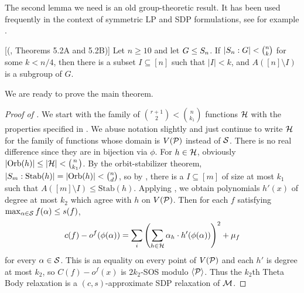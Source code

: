 The second lemma we need is an old group-theoretic result. It has been used frequently in the context of symmetric LP and SDP formulations, see for example \cite{LRST14,KPT10,BFPS12}. 
\begin{lemma}\label{lem:dixandmort}[(\cite{DM96}, Theorems 5.2A and 5.2B)]
Let $n \geq 10$ and let $G \leq S_{n}$. If $|S_{n}: G| < \binom{n}{k}$ for some $k < n/4$, then there is a subset $I \subseteq [n]$ such that $|I| < k$, and $A([n] \setminus I)$ is a subgroup of $G$.
\end{lemma}
We are ready to prove the main theorem.
\begin{proof}[Proof of ]
We start with the family of $\binom{r+1}{2} < \binom{n}{k_1}$ functions $\mathcal H$ with the properties specified in . We abuse notation slightly and just continue to write $\mathcal H$ for the family of functions whose domain is $V(\mathcal P)$ instead of $\mathcal S$. There is no real difference since they are in bijection via $\phi$. For $h \in \mathcal H$, obviously $|\text{Orb}(h)| \leq |\mathcal H| < \binom{n}{k_1}$. By the orbit-stabilizer theorem, $|S_{m} : \text{Stab}(h)| = |\text{Orb}(h)| < \binom{n}{d}$, so by , there is a $I \subseteq [m]$ of size at most $k_1$ such that $A([m] \setminus I) \leq \text{Stab}(h)$. Applying , we obtain polynomials $h'(x)$ of degree at most $k_2$ which agree with $h$ on $V(\mathcal P)$. Then for each $f$ satisfying $\max_{\alpha \in \mathcal S} f(\alpha) \leq s(f)$,
\[c(f) - o^f(\phi(\alpha)) = \sum_i \left(\sum_{h \in \mathcal H} \alpha_h \cdot h'(\phi(\alpha))\right)^2 + \mu_f\]
for every $\alpha \in \mathcal S$. This is an equality on every point of $V(\mathcal P)$ and each $h'$ is degree at most $k_2$, so $C(f) - o^f(x)$ is $2k_2$-SOS modulo $\langle \mathcal P \rangle$. Thus the $k_2$th Theta Body relaxation is a $(c,s)$-approximate SDP relaxation of $\mathcal M$. 
\end{proof}

